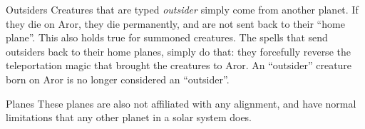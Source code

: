 \begin{35e}{Outsiders}
  Creatures that are typed \emph{outsider} simply come from another planet. If
  they die on Aror, they die permanently, and are not sent back to their
  ``home plane''. This also holds true for summoned creatures. The spells that
  send outsiders back to their home planes, simply do that: they forcefully
  reverse the teleportation magic that brought the creatures to Aror. An
  ``outsider'' creature born on Aror is no longer considered an ``outsider''.
\end{35e}

\begin{35e}{Planes}
  These planes are also not affiliated with any alignment, and have normal
  limitations that any other planet in a solar system does.
\end{35e}






